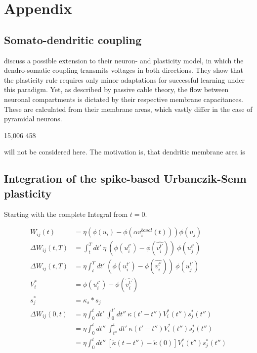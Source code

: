 
\chapter{Appendix}



\section{Somato-dendritic coupling}\label{sec-somato-dendr}

\cite{urbanczik2014learning} discuss a possible extension to their neuron- and plasticity model, in which the
dendro-somatic coupling transmits voltages in both directions. They show that the plasticity rule requires only minor
adaptations for successful learning under this paradigm. Yet, as described by passive cable theory, the flow between
neuronal compartments is dictated by their respective membrane capacitances. These are calculated from their membrane
areas, which vastly differ in the case of pyramidal neurons. 


15,006 458


will not be considered here. The motivation is, that dendritic membrane area is


\section{Integration of the spike-based Urbanczik-Senn plasticity}



Starting with the complete Integral from $t=0$.

\begin{align}
  \dot{W_{ij}}(t)    & = \eta (\phi(u_i) - \phi(\alpha v^{basal}_i(t))) \phi(u_j)                                                     \\
  \Delta W_{ij}(t,T) & = \int_t^T dt' \ \eta \  (\phi(u_i^{t'}) - \phi(\widehat{v_i^{t'}})) \  \phi(u_j^{t'})                         \\
  \Delta W_{ij}(t,T) & = \eta \int_t^T dt' \  (\phi(u_i^{t'}) - \phi(\widehat{v_i^{t'}})) \ \phi(u_j^{t'})                            \\
  V_i^*              & = \phi(u_i^{t'}) - \phi(\widehat{v_i^{t'}})                                                                    \\
  s_j^*              & = \kappa_s * s_j                                                                                               \\
  \Delta W_{ij}(0,t) & =\eta \int_0^t dt' \  \int_0^{t'} dt'' \ \kappa(t'-t'') V_i^\ast (t'') s_j^\ast (t'')                          \\
                     & = \eta \int_0^t dt'' \  \int_{t''}^{t} dt' \ \kappa(t'-t'') V_i^\ast (t'') s_j^\ast (t'')                      \\
                     & = \eta \int_0^t dt'' \  \left[ \tilde{\kappa}(t-t'') - \tilde{\kappa}(0) \right] V_i^\ast (t'') s_j^\ast (t'') \\
\end{align}

